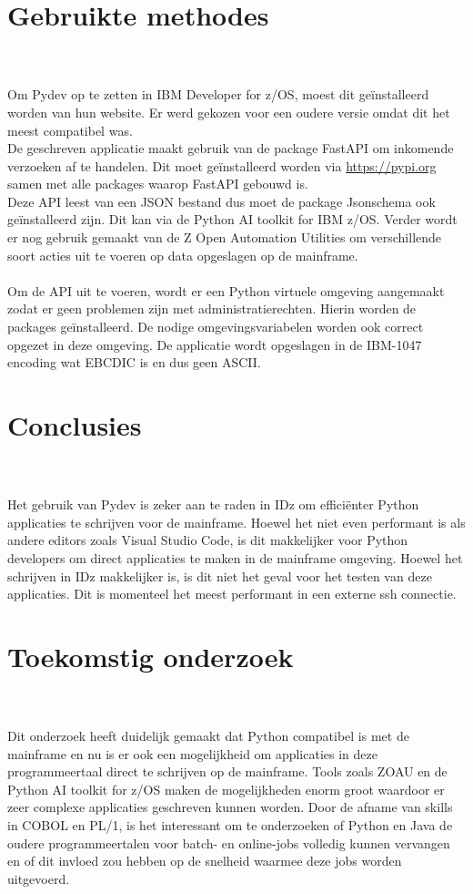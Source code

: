 \documentclass[a0,portrait]{hogent-poster}
\begin{document}
\begin{multicols}{2}
\section{Gebruikte methodes}\\ \\

Om Pydev op te zetten in IBM Developer for z/OS, moest dit geïnstalleerd worden van hun website. Er werd gekozen voor een oudere versie omdat dit het meest compatibel was. \\
De geschreven applicatie maakt gebruik van de package FastAPI om inkomende verzoeken af te handelen. Dit moet geïnstalleerd worden via \url{https://pypi.org} samen met alle packages waarop FastAPI gebouwd is. \\
Deze API leest van een JSON bestand dus moet de package Jsonschema ook geïnstalleerd zijn. Dit kan via de Python AI toolkit for IBM z/OS.
Verder wordt er nog gebruik gemaakt van de Z Open Automation Utilities om verschillende soort acties uit te voeren op data opgeslagen op de mainframe. \\ \\
Om de API uit te voeren, wordt er een Python virtuele omgeving aangemaakt zodat er geen problemen zijn met administratierechten. Hierin worden de packages geïnstalleerd. De nodige omgevingsvariabelen worden ook correct opgezet in deze omgeving. De applicatie wordt opgeslagen in de IBM-1047 encoding wat EBCDIC is en dus geen ASCII. 

\section{Conclusies}\\ \\

Het gebruik van Pydev is zeker aan te raden in IDz om efficiënter Python applicaties te schrijven voor de mainframe. Hoewel het niet even performant is als andere editors zoals Visual Studio Code, is dit makkelijker voor Python developers om direct applicaties te maken in de mainframe omgeving. Hoewel het schrijven in IDz makkelijker is, is dit niet het geval voor het testen van deze applicaties. Dit is momenteel het meest performant in een externe ssh connectie.

\section{Toekomstig onderzoek}\\ \\

Dit onderzoek heeft duidelijk gemaakt dat Python compatibel is met de mainframe
en nu is er ook een mogelijkheid om applicaties in deze programmeertaal
direct te schrijven op de mainframe. Tools zoals ZOAU en de Python AI toolkit for
z/OS maken de mogelijkheden enorm groot waardoor er zeer complexe applicaties
geschreven kunnen worden. Door de afname van skills in COBOL en PL/1, is het interessant
om te onderzoeken of Python en Java de oudere programmeertalen voor
batch- en online-jobs volledig kunnen vervangen en of dit invloed zou hebben op
de snelheid waarmee deze jobs worden uitgevoerd.

\end{multicols}
\end{document}
